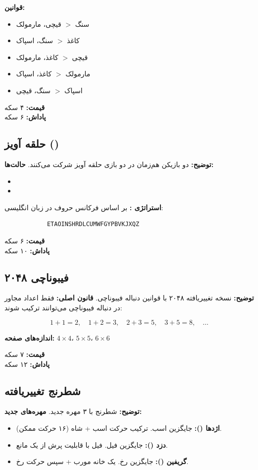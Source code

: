 \documentclass[12pt,a4paper]{article}
\begin{document}
	\textbf{قوانین:}
	\begin{itemize}
		\item سنگ $>$ قیچی، مارمولک
		\item کاغذ $>$ سنگ، اسپاک
		\item قیچی $>$ کاغذ، مارمولک
		\item مارمولک $>$ کاغذ، اسپاک
		\item اسپاک $>$ سنگ، قیچی
	\end{itemize}
	
	\textbf{قیمت:} ۴ سکه\\
	\textbf{پاداش:} ۶ سکه
	
	\subsection{حلقه آویز ()}
	\textbf{توضیح:} دو بازیکن هم‌زمان در دو بازی حلقه آویز شرکت می‌کنند.
	\textbf{حالت‌ها:}
	\begin{itemize}
		\item {}
		\item {}
	\end{itemize}
	
	\textbf{استراتژی :} بر اساس فرکانس حروف در زبان انگلیسی:
	\begin{latin}
		\begin{verbatim}
			ETAOINSHRDLCUMWFGYPBVKJXQZ
		\end{verbatim}
	\end{latin}
	
	\textbf{قیمت:} ۶ سکه\\
	\textbf{پاداش:} ۱۰ سکه
	
	\subsection{فیبوناچی ۲۰۴۸}
	\textbf{توضیح:} نسخه تغییریافته ۲۰۴۸ با قوانین دنباله فیبوناچی.
	\textbf{قانون اصلی:} فقط اعداد مجاور در دنباله فیبوناچی می‌توانند ترکیب شوند:
	
	$$
	1 + 1 = 2, \quad 1 + 2 = 3, \quad 2 + 3 = 5, \quad 3 + 5 = 8, \quad \ldots
	$$
	
	\textbf{اندازه‌های صفحه:} $4 \times 4$، $5 \times 5$، $6 \times 6$
	
	\textbf{قیمت:} ۷ سکه\\
	\textbf{پاداش:} ۱۲ سکه
	
	\subsection{شطرنج تغییریافته}
	\textbf{توضیح:} شطرنج با ۳ مهره جدید.
	\textbf{مهره‌های جدید:}
	\begin{itemize}
		\item \textbf{اژدها ():} جایگزین اسب. ترکیب حرکت اسب + شاه (۱۶ حرکت ممکن).
		\item \textbf{دزد ():} جایگزین فیل. فیل با قابلیت پرش از یک مانع.
		\item \textbf{گریفین ():} جایگزین رخ. یک خانه مورب + سپس حرکت رخ.
	\end{itemize}
	
\end{document}
